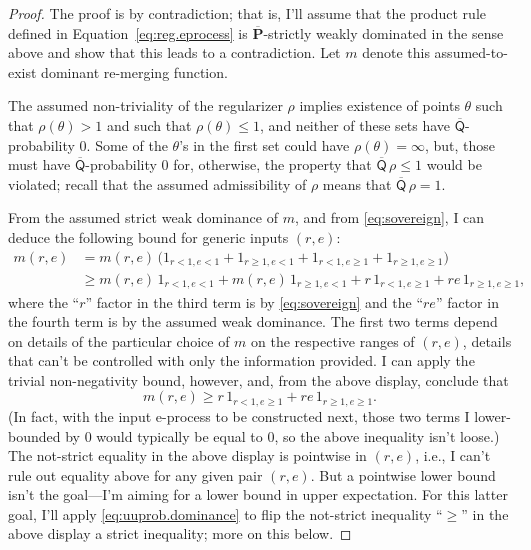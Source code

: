 \documentclass[10pt,a4paper]{amsart}
\newcommand{\uprior}{\overline{\mathsf{Q}}}
\newcommand{\uuprob}{\mathbf{\overline{P}}}
\begin{document}
\begin{proof}
The proof is by contradiction; that is, I'll assume that the product rule defined in Equation~\eqref{eq:reg.eprocess} is $\uuprob$-strictly weakly dominated in the sense above and show that this leads to a contradiction.  Let $m$ denote this assumed-to-exist dominant re-merging function. 

The assumed non-triviality of the regularizer $\rho$ implies existence of points $\theta$ such that $\rho(\theta) > 1$ and such that $\rho(\theta) \leq 1$, and neither of these sets have $\uprior$-probability 0.  Some of the $\theta$'s in the first set could have $\rho(\theta) = \infty$, but, those must have  $\uprior$-probability 0 for, otherwise, the property that $\uprior\,\rho \leq 1$ would be violated; recall that the assumed admissibility of $\rho$ means that $\uprior\,\rho=1$.  

From the assumed strict weak dominance of $m$, and from \eqref{eq:sovereign}, I can deduce the following bound for generic inputs $(r,e)$:
\begin{align*}
m(r,e) & = m(r,e) \, \bigl( 1_{r < 1, e < 1} + 1_{r \geq 1, e < 1} + 1_{r < 1, e \geq 1} + 1_{r \geq 1, e \geq 1} \bigr) \\
& \geq  m(r,e) \, 1_{r < 1, e < 1} + m(r,e) \, 1_{r \geq 1, e < 1} + r \, 1_{r < 1, e \geq 1} + re \, 1_{r \geq 1, e \geq 1},
\end{align*}
where the ``$r$'' factor in the third term is by \eqref{eq:sovereign} and the ``$re$'' factor in the fourth term is by the assumed weak dominance.  The first two terms depend on details of the particular choice of $m$ on the respective ranges of $(r,e)$, details that can't be controlled with only the information provided.  I can apply the trivial non-negativity bound, however, and, from the above display, conclude that 
\[ m(r,e) \geq r \, 1_{r < 1, e \geq 1} + re \, 1_{r \geq 1, e \geq 1}. \]
(In fact, with the input e-process to be constructed next, those two terms I lower-bounded by 0 would typically be equal to 0, so the above inequality isn't loose.)  The not-strict equality in the above display is pointwise in $(r,e)$, i.e., I can't rule out equality above for any given pair $(r,e)$.  But a pointwise lower bound isn't the goal---I'm aiming for a lower bound in upper expectation.  For this latter goal, I'll apply \eqref{eq:uuprob.dominance} to flip the not-strict inequality ``$\geq$'' in the above display a strict inequality; more on this below.  


\end{proof}
\end{document}
